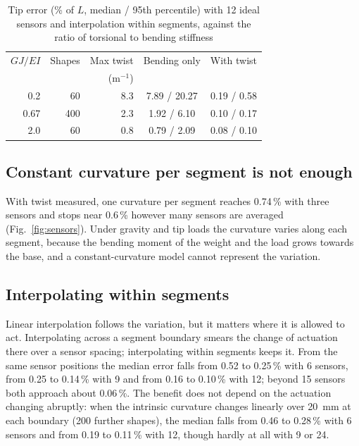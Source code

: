 \documentclass[conference]{IEEEtran}
\begin{document}
\begin{table}[t]
\caption{Tip error (\% of $L$, median / 95th percentile) with 12 ideal
sensors and interpolation within segments, against the ratio of torsional
to bending stiffness}
\label{tab:twist}
\centering
\begin{tabular}{@{}rrrcc@{}}
\toprule
$GJ/EI$ & Shapes & Max twist & Bending only & With twist \\
 & & (m$^{-1}$) & & \\
\midrule
0.2 & 60 & 8.3 & 7.89 / 20.27 & 0.19 / 0.58 \\
0.67 & 400 & 2.3 & 1.92 / 6.10 & 0.10 / 0.17 \\
2.0 & 60 & 0.8 & 0.79 / 2.09 & 0.08 / 0.10 \\
\bottomrule
\end{tabular}
\end{table}

\subsection{Constant curvature per segment is not enough}

With twist measured, one curvature per segment reaches 0.74\,\% with three
sensors and stops near 0.6\,\% however many sensors are averaged
(Fig.~\ref{fig:sensors}). Under gravity and tip loads the curvature varies
along each segment, because the bending moment of the weight and the load
grows towards the base, and a constant-curvature model cannot represent the
variation.

\subsection{Interpolating within segments}

Linear interpolation follows the variation, but it matters where it is
allowed to act. Interpolating across a segment boundary smears the change of
actuation there over a sensor spacing; interpolating within segments keeps
it. From the same sensor positions the median error falls from 0.52 to
0.25\,\% with 6 sensors, from 0.25 to 0.14\,\% with 9 and from 0.16 to
0.10\,\% with 12; beyond 15 sensors both approach about 0.06\,\%. The
benefit does not depend on the actuation changing abruptly: when the
intrinsic curvature changes linearly over \SI{20}{mm} at each boundary (200
further shapes), the median falls from 0.46 to 0.28\,\% with 6 sensors and
from 0.19 to 0.11\,\% with 12, though hardly at all with 9 or 24.
\end{document}
